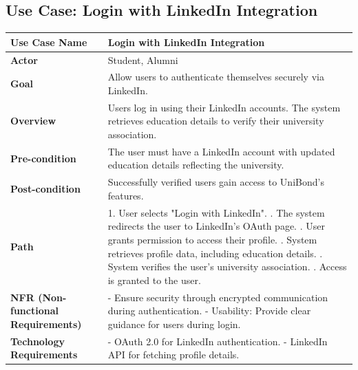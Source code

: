 \documentclass[a4paper,12pt]{article}
\begin{document}
\subsection{Use Case: Login with LinkedIn Integration}
\begin{longtable}{|p{3cm}|p{12cm}|}
\hline
\textbf{Use Case Name} & Login with LinkedIn Integration \\ \hline
\textbf{Actor} & Student, Alumni \\ \hline
\textbf{Goal} & Allow users to authenticate themselves securely via LinkedIn. \\ \hline
\textbf{Overview} & Users log in using their LinkedIn accounts. The system retrieves education details to verify their university association. \\ \hline
\textbf{Pre-condition} & The user must have a LinkedIn account with updated education details reflecting the university. \\ \hline
\textbf{Post-condition} & Successfully verified users gain access to UniBond's features. \\ \hline
\textbf{Path} & 
1. User selects "Login with LinkedIn". \newline
2. The system redirects the user to LinkedIn's OAuth page. \newline
3. User grants permission to access their profile. \newline
4. System retrieves profile data, including education details. \newline
5. System verifies the user's university association. \newline
6. Access is granted to the user. \\ \hline
\textbf{NFR (Non-functional Requirements)} & 
- Ensure security through encrypted communication during authentication. \newline
- Usability: Provide clear guidance for users during login. \\ \hline
\textbf{Technology Requirements} & 
- OAuth 2.0 for LinkedIn authentication. \newline
- LinkedIn API for fetching profile details. \\ \hline
\end{longtable}
\end{document}
